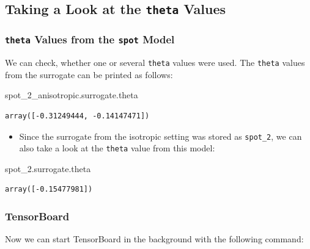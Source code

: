 \documentclass[
  letterpaper,
  DIV=11,
  numbers=noendperiod]{scrreprt}
\newenvironment{Shaded}{\begin{snugshade}}{\end{snugshade}}
\newcommand{\NormalTok}[1]{\textcolor[rgb]{0.00,0.23,0.31}{#1}}
\providecommand{\tightlist}{%
  \setlength{\itemsep}{0pt}\setlength{\parskip}{0pt}}\usepackage{longtable,booktabs,array}
\begin{document}
\subsection{\texorpdfstring{Taking a Look at the \texttt{theta}
Values}{Taking a Look at the theta Values}}\label{taking-a-look-at-the-theta-values}

\subsubsection{\texorpdfstring{\texttt{theta} Values from the
\texttt{spot}
Model}{theta Values from the spot Model}}\label{theta-values-from-the-spot-model}

We can check, whether one or several \texttt{theta} values were used.
The \texttt{theta} values from the surrogate can be printed as follows:

\begin{Shaded}
\begin{Highlighting}[]
\NormalTok{spot\_2\_anisotropic.surrogate.theta}
\end{Highlighting}
\end{Shaded}

\begin{verbatim}
array([-0.31249444, -0.14147471])
\end{verbatim}

\begin{itemize}
\tightlist
\item
  Since the surrogate from the isotropic setting was stored as
  \texttt{spot\_2}, we can also take a look at the \texttt{theta} value
  from this model:
\end{itemize}

\begin{Shaded}
\begin{Highlighting}[]
\NormalTok{spot\_2.surrogate.theta}
\end{Highlighting}
\end{Shaded}

\begin{verbatim}
array([-0.15477981])
\end{verbatim}

\subsubsection{TensorBoard}\label{tensorboard-4}

Now we can start TensorBoard in the background with the following
command:
\end{document}
